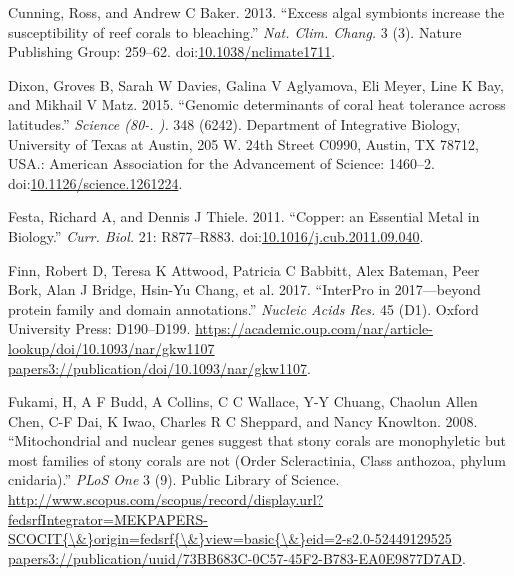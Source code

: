\documentclass[]{elsarticle} %
\begin{document}
\hypertarget{ref-Cunning_2013}{}
Cunning, Ross, and Andrew C Baker. 2013. ``Excess algal symbionts
increase the susceptibility of reef corals to bleaching.'' \emph{Nat.
Clim. Chang.} 3 (3). Nature Publishing Group: 259--62.
doi:\href{https://doi.org/10.1038/nclimate1711}{10.1038/nclimate1711}.

\hypertarget{ref-Dixon2015}{}
Dixon, Groves B, Sarah W Davies, Galina V Aglyamova, Eli Meyer, Line K
Bay, and Mikhail V Matz. 2015. ``Genomic determinants of coral heat
tolerance across latitudes.'' \emph{Science (80-. ).} 348 (6242).
Department of Integrative Biology, University of Texas at Austin, 205 W.
24th Street C0990, Austin, TX 78712, USA.: American Association for the
Advancement of Science: 1460--2.
doi:\href{https://doi.org/10.1126/science.1261224}{10.1126/science.1261224}.

\hypertarget{ref-Festa2011}{}
Festa, Richard A, and Dennis J Thiele. 2011. ``Copper: an Essential
Metal in Biology.'' \emph{Curr. Biol.} 21: R877--R883.
doi:\href{https://doi.org/10.1016/j.cub.2011.09.040}{10.1016/j.cub.2011.09.040}.

\hypertarget{ref-Finn2017}{}
Finn, Robert D, Teresa K Attwood, Patricia C Babbitt, Alex Bateman, Peer
Bork, Alan J Bridge, Hsin-Yu Chang, et al. 2017. ``InterPro in
2017---beyond protein family and domain annotations.'' \emph{Nucleic
Acids Res.} 45 (D1). Oxford University Press: D190--D199.
\href{https://academic.oup.com/nar/article-lookup/doi/10.1093/nar/gkw1107\%20papers3://publication/doi/10.1093/nar/gkw1107}{https://academic.oup.com/nar/article-lookup/doi/10.1093/nar/gkw1107 papers3://publication/doi/10.1093/nar/gkw1107}.

\hypertarget{ref-Fukami2008}{}
Fukami, H, A F Budd, A Collins, C C Wallace, Y-Y Chuang, Chaolun Allen
Chen, C-F Dai, K Iwao, Charles R C Sheppard, and Nancy Knowlton. 2008.
``Mitochondrial and nuclear genes suggest that stony corals are
monophyletic but most families of stony corals are not (Order
Scleractinia, Class anthozoa, phylum cnidaria).'' \emph{PLoS One} 3 (9).
Public Library of Science.
\href{http://www.scopus.com/scopus/record/display.url?fedsrfIntegrator=MEKPAPERS-SCOCIT\%7B/\&\%7Dorigin=fedsrf\%7B/\&\%7Dview=basic\%7B/\&\%7Deid=2-s2.0-52449129525\%20papers3://publication/uuid/73BB683C-0C57-45F2-B783-EA0E9877D7AD}{http://www.scopus.com/scopus/record/display.url?fedsrfIntegrator=MEKPAPERS-SCOCIT\{\textbackslash{}\&\}origin=fedsrf\{\textbackslash{}\&\}view=basic\{\textbackslash{}\&\}eid=2-s2.0-52449129525 papers3://publication/uuid/73BB683C-0C57-45F2-B783-EA0E9877D7AD}.
\end{document}
